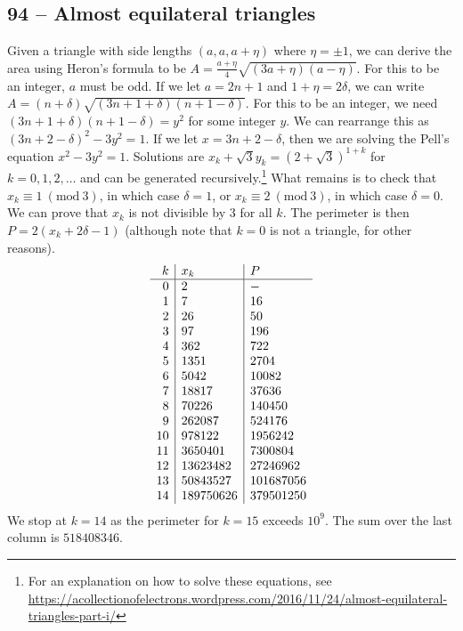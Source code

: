 \documentclass{article}
\newcommand{\Mod}[1]{\ (\mathrm{mod}\ #1)}
\begin{document}
\subsection*{94 -- Almost equilateral triangles} 
Given a triangle with side lengths $(a, a, a+\eta)$ where $\eta = \pm 1$, we can derive the area using Heron's formula to be $A = \frac{a+\eta}{4}\sqrt{(3a+\eta)(a-\eta)}$. 
For this to be an integer, $a$ must be odd.
If we let $a = 2n+1$ and $1 + \eta = 2 \delta$, we can write $A = (n+\delta) \sqrt{ (3n + 1 + \delta)(n + 1 - \delta)}$.
For this to be an integer, we need $(3n + 1 + \delta)(n + 1 - \delta) = y^2$ for some integer $y$.
We can rearrange this as $(3n + 2 - \delta)^2 - 3y^2 = 1$. 
If we let $x = 3n + 2 - \delta$, then we are solving the Pell's equation $x^2 - 3y^2 = 1$. 
Solutions are $x_k + \sqrt{3} y_k = (2+\sqrt{3})^{1+k}$ for $k = 0, 1, 2, \dotsc$ and can be generated recursively.\footnote{For an explanation on how to solve these equations, see \url{https://acollectionofelectrons.wordpress.com/2016/11/24/almost-equilateral-triangles-part-i/}}
What remains is to check that $x_k \equiv 1 \Mod 3$, in which case $\delta = 1$, or $x_k \equiv 2 \Mod 3$, in which case $\delta = 0$. 
We can prove that $x_k$ is not divisible by 3 for all $k$. 
The perimeter is then $P = 2(x_k + 2\delta - 1)$ (although note that $k=0$ is not a triangle, for other reasons).
\begin{align*}
	\begin{array}{r | l | l }
	k & x_k & P \\ \hline
	0 & 2 & - \\ 
	1 & 7 & 16 \\  
	2 & 26 & 50 \\ 
	3 & 97 & 196 \\ 
	4 & 362 & 722 \\ 
	5 & 1351 & 2704 \\ 
	6 & 5042 & 10082 \\ 
	7 & 18817 & 37636 \\ 
	8 & 70226 & 140450 \\ 
	9 & 262087 & 524176 \\ 
	10 & 978122 & 1956242 \\ 
	11 & 3650401 & 7300804 \\ 
	12 & 13623482 & 27246962 \\ 
	13 & 50843527 & 101687056 \\ 
	14 & 189750626 & 379501250 
	\end{array}
\end{align*}
We stop at $k=14$ as the perimeter for $k=15 $ exceeds $10^9$.
The sum over the last column is $\boxed{518408346}$.
\end{document}
